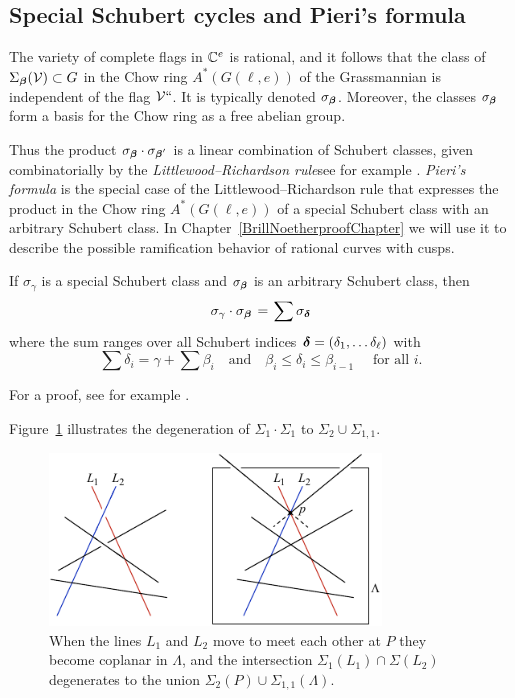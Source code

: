 \subsection*{Special Schubert cycles and Pieri's formula}

\begin{fact}
The variety of complete flags in ${\mathbb C}^e$ is rational, and it follows
%
that the class of $\Sigma_{{\boldsymbol{\beta}}}({\mathcal V})\subset G$
in the
Chow ring
%
$A^*(G(\ell, e))$ of the
Grassmannian
%
is independent
of the flag ${\mathcal V}` `$. It is typically denoted $\sigma_{{\boldsymbol{\beta}}}$. Moreover,
the classes $\sigma_{{\boldsymbol{\beta}}}$ form a basis for the Chow ring as a free
abelian group.
\end{fact}

Thus the product $\sigma_\bbeta
\cdot \sigma_{\smash{\bbeta'}\vphantom\beta}$  %
is a linear
combination of Schubert classes,
given combinatorially by the \emph{Littlewood--Richardson rule}\emdash see
%
for example \cite{MR2247964}.
\emph{Pieri's formula}
%
is the special
case of the Littlewood--Richardson rule that expresses the product in
the Chow ring $A^*(G(\ell, e))$ of a special Schubert class with an
arbitrary Schubert class.
In Chapter~\ref{BrillNoetherproofChapter} we will use it to describe
the possible ramification behavior of rational curves with cusps.

\begin{proposition}
\label{Pieri}
If $\sigma_\gamma$ is a
special Schubert class
%
and $\sigma_{{\boldsymbol{\beta}}}$
is an arbitrary Schubert class, then
%
$$
\sigma_\gamma \cdot \sigma_{\bbeta} \; = \; \sum \sigma_{\bdelta}
$$
where the sum ranges over all Schubert indices ${{\boldsymbol{\delta}}} = (\delta_1,
\dots \delta_{\ell})$ with
$$
\sum \delta_i = \gamma + \sum \beta_i \quad \text{and} \quad \beta_i
\leq \delta_i \leq \beta_{i-1}\quad \text{ for all } i
.
$$
\end{proposition}

For a proof, see for example \cite[Section 4.2.4]{3264}.

Figure~\ref{intersection product} illustrates the degeneration of
$\Sigma_1\cdot \Sigma_1$ to $\Sigma_2 \cup \Sigma_{1,1}$.

\begin{figure}[b]
\includegraphics[height=1.8in]{main/Fig12-3}
\caption{When the lines $L_1$ and $L_2$ move to meet each other at $P$
they become coplanar in $\Lambda$,
and the intersection $\Sigma_1(L_1) \cap \Sigma(L_2)$
degenerates to the union $\Sigma_2(P) \cup \Sigma_{1,1}(\Lambda)$.
}
\label{intersection product}
\end{figure}

